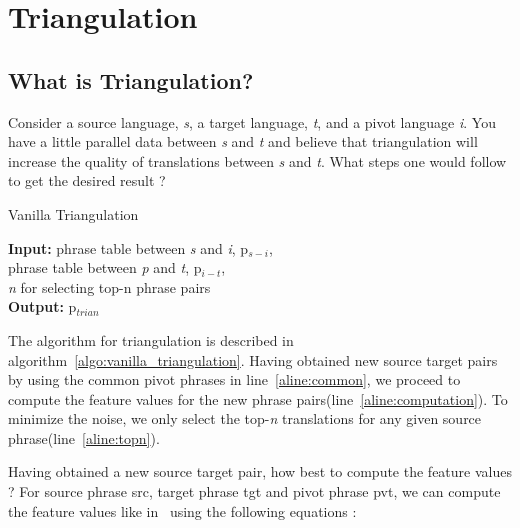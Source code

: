 \chapter{Triangulation}
\label{chap:triangulation}


\section{What is Triangulation?}
\label{sec:triangulation}

Consider a source language, \emph{s}, a target language, \emph{t}, and a pivot language \emph{i}. You have a little parallel data between \emph{s} and \emph{t} and believe that triangulation will increase the quality of translations between \emph{s} and \emph{t}. What steps one would follow to get the desired result ?

\begin{algorithm}
\caption{Vanilla Triangulation}
\label{algo:vanilla_triangulation}

\textbf{Input:} phrase table between \emph{s} and \emph{i}, p$_{s-i}$, \\
 phrase table between \emph{p} and \emph{t}, p$_{i-t}$,  \\
 \emph{n} for selecting top-n phrase pairs \\
\textbf{Output:} p$_{trian}$
\begin{algorithmic}[l]
 \label{aline:common}

         \label{aline:computation}
        \ENDFOR
         \label{aline:topn}
        \ENDIF
        \ENDFOR


\end{algorithmic}

\end{algorithm}

The algorithm for triangulation is described in algorithm~\ref{algo:vanilla_triangulation}. Having obtained new source target pairs by using the common pivot phrases in line~\ref{aline:common}, we proceed to compute the feature values for the new phrase pairs(line~\ref{aline:computation}). To minimize the noise, we only select the top-\emph{n} translations for any given source phrase(line~\ref{aline:topn}).  

Having obtained a new source target pair, how best to compute the feature values ? For source phrase src, target phrase tgt and pivot phrase pvt, we can compute the feature values like in~\cite{Utiyama:07} using the following equations : 

